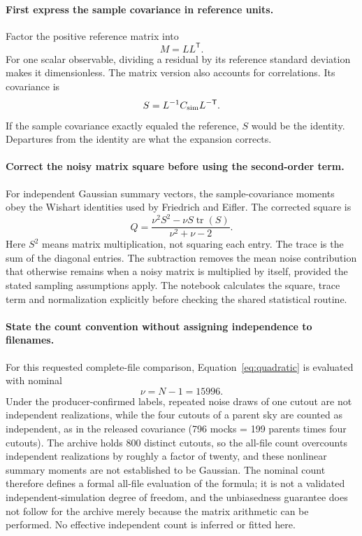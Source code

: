 \documentclass[11pt]{article}
\begin{document}
\paragraph{First express the sample covariance in reference units.}
Factor the positive reference matrix into
\begin{equation}
 M=L L^{\mathsf T}.
\end{equation}
For one scalar observable, dividing a residual by its reference standard
deviation makes it dimensionless. The matrix version also accounts for
correlations. Its covariance is
\begin{equation}
 S=L^{-1}C_{\rm sim}L^{-\mathsf T}.
\end{equation}
If the sample covariance exactly equaled the reference, $S$ would be the
identity. Departures from the identity are what the expansion corrects.

\paragraph{Correct the noisy matrix square before using the second-order term.}
For independent Gaussian summary vectors, the sample-covariance moments
obey the Wishart identities used by Friedrich and Eifler. The corrected
square is
\begin{equation}
 Q=\frac{\nu^2 S^2-\nu S\operatorname{tr}(S)}{\nu^2+\nu-2}.
 \label{eq:quadratic}
\end{equation}
Here $S^2$ means matrix multiplication, not squaring each entry.
The trace is the sum of the diagonal entries. The subtraction removes the
mean noise contribution that otherwise remains when a noisy matrix is
multiplied by itself, provided the stated sampling assumptions apply.
The notebook calculates the square, trace term and normalization explicitly
before checking the shared statistical routine.

\paragraph{State the count convention without assigning independence to filenames.}
For this requested complete-file comparison, Equation~\eqref{eq:quadratic}
is evaluated with nominal
\begin{equation}
 \nu=N-1=15996.
\end{equation}
Under the producer-confirmed labels, repeated noise draws of one cutout
are not independent realizations, while the four cutouts of a parent sky
are counted as independent, as in the released covariance (796 mocks =
199 parents times four cutouts). The archive holds 800 distinct cutouts,
so the all-file count overcounts independent realizations by roughly a
factor of twenty, and these nonlinear summary moments are not established
to be Gaussian. The nominal count therefore defines a formal all-file
evaluation of the formula; it is not a validated independent-simulation
degree of freedom, and the unbiasedness guarantee does not follow for the
archive merely because the matrix arithmetic can be performed. No
effective independent count is inferred or fitted here.
\end{document}
